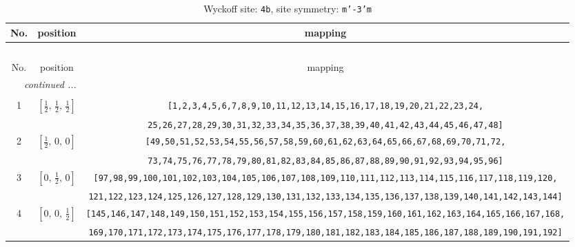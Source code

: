 \documentclass[fleqn,8pt]{jsarticle}
\begin{document}
\begin{longtable}{ccc}
\caption{Wyckoff site: {\tt 4b}, site symmetry: {\tt m'-3'm}}
 \\
 \hline \hline
No. & position & mapping \\ \hline \endfirsthead

\multicolumn{2}{l}{\tablename\ \thetable{}} \\
 \hline \hline
No. & position & mapping \\ \hline \endhead

 \hline \hline
\multicolumn{2}{r}{\footnotesize\it continued ...} \\ \endfoot

 \hline \hline
\multicolumn{2}{r}{} \\ \endlastfoot

1 & $\left[ \frac{1}{2},\, \frac{1}{2},\, \frac{1}{2} \right]$ & {\tt [1,2,3,4,5,6,7,8,9,10,11,12,13,14,15,16,17,18,19,20,21,22,23,24,} \\ \hline
 &  & {\tt 25,26,27,28,29,30,31,32,33,34,35,36,37,38,39,40,41,42,43,44,45,46,47,48]} \\ \hline
2 & $\left[ \frac{1}{2},\, 0,\, 0 \right]$ & {\tt [49,50,51,52,53,54,55,56,57,58,59,60,61,62,63,64,65,66,67,68,69,70,71,72,} \\ \hline
 &  & {\tt 73,74,75,76,77,78,79,80,81,82,83,84,85,86,87,88,89,90,91,92,93,94,95,96]} \\ \hline
3 & $\left[ 0,\, \frac{1}{2},\, 0 \right]$ & {\tt [97,98,99,100,101,102,103,104,105,106,107,108,109,110,111,112,113,114,115,116,117,118,119,120,} \\ \hline
 &  & {\tt 121,122,123,124,125,126,127,128,129,130,131,132,133,134,135,136,137,138,139,140,141,142,143,144]} \\ \hline
4 & $\left[ 0,\, 0,\, \frac{1}{2} \right]$ & {\tt [145,146,147,148,149,150,151,152,153,154,155,156,157,158,159,160,161,162,163,164,165,166,167,168,} \\ \hline
 &  & {\tt 169,170,171,172,173,174,175,176,177,178,179,180,181,182,183,184,185,186,187,188,189,190,191,192]} \\
\end{longtable}
\renewcommand{\arraystretch}{1.2}
\end{document}
